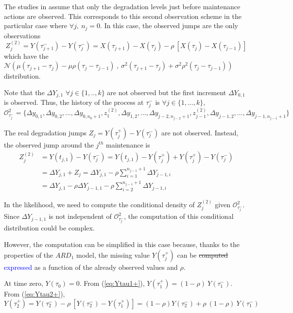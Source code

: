 The studies in \cite{salles_semiparametric_2020, kamranfar_inference_2021} assume that only the degradation levels just before maintenance actions are observed. This corresponds to this second observation scheme in the particular case where $\forall j,\ n_j=0$.
In this case, the observed jumps are the only observations 
$$Z_j^{(2)} = Y(\tau_{j+1}^-) - Y(\tau_{j}^-) = X(\tau_{j+1})- X(\tau_j)-\rho\ \left[  X(\tau_j) - X(\tau_{j-1}) \right]$$
\noindent which have the $\mathcal{N}\left(\mu  (\tau_{j+1} - \tau_{j})- \mu \rho (\tau_j - \tau_{j-1})\ ,\ \sigma^2 (\tau_{j+1} - \tau_{j}) + \sigma^2 \rho^2 (\tau_j - \tau_{j-1})\right)$ distribution.

\noindent Note that the $\Delta Y_{j,1}$ $\forall j \in \{1,..,k\}$ are not observed but the first increment $\Delta Y_{0,1}$ is observed. Thus, the history of the process at $\tau_j^-$ is
$\forall j \in \{1,...,k\}$,\\
$\mathcal{O}_{\tau_j^-}^2=\{\Delta y_{0,1}, \Delta y_{0,2},...,\Delta y_{0,n_0+1},z_{1}^{(2)},\Delta y_{1,2},...,\Delta y_{j-2,n_{j-2}+1},z_{j-1}^{(2)}, \Delta y_{j-1,2},...,\Delta y_{j-1,n_{j-1}+1}\}\ $ 

\noindent The real degradation jumps $Z_j = Y(\tau_{j}^+) - Y(\tau_{j}^-)$ are not observed.
Instead, the observed jump around the $j^{th}$ maintenance is 
\begin{align}
Z_j^{(2)}&= Y(t_{j,1})-Y(\tau_j^-) = Y(t_{j,1})-Y(\tau_j^+)+Y(\tau_j^+)-Y(\tau_j^-) \nonumber \\
&= \Delta Y_{j,1}+Z_j = \Delta Y_{j,1}-\rho \sum\limits_{i=1}^{n_{j-1}+1} \Delta Y_{j-1,i} \nonumber \\
&= \Delta Y_{j,1} -\rho \Delta Y_{j-1,1} -\rho \sum\limits_{i=2}^{n_{j-1}+1} \Delta Y_{j-1,i} \label{eq:Zj21}
\end{align}

In the likelihood, we need to compute the conditional density of $Z_j^{(2)}$ given $\mathcal{O}_{\tau_j^-}^2$. Since $\Delta Y_{j-1,1}$ is not independent of $\mathcal{O}_{\tau_j^-}^2$, the computation of this conditional distribution could be complex.

\noindent However, the computation can be simplified in this case because, thanks to the properties of the $ARD_1$ model, the missing value $Y(\tau_j^+)$ can be \st{computed} \textcolor{blue}{expressed} as a function of the already observed values and $\rho$.

\noindent At time zero, $Y(\tau_0)=0$. From (\ref{eq:Ytau1+}), $Y(\tau_1^+) = (1-\rho)\ Y(\tau_1^-)$. From (\ref{eq:Ytau2+}), 
$$Y(\tau_2^+)= Y(\tau_2^-)-\rho\ \left[ Y(\tau_2^-)-Y(\tau_1^+)\right]= (1-\rho) Y(\tau_2^-)+\rho\ (1-\rho)\ Y(\tau_1^-)$$

